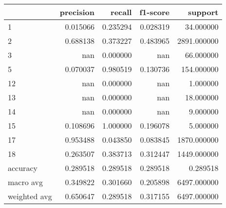 \begin{tabular}{lrrrr}
\toprule
 & precision & recall & f1-score & support \\
\midrule
1 & 0.015066 & 0.235294 & 0.028319 & 34.000000 \\
2 & 0.688138 & 0.373227 & 0.483965 & 2891.000000 \\
3 & nan & 0.000000 & nan & 66.000000 \\
5 & 0.070037 & 0.980519 & 0.130736 & 154.000000 \\
12 & nan & 0.000000 & nan & 1.000000 \\
13 & nan & 0.000000 & nan & 18.000000 \\
14 & nan & 0.000000 & nan & 9.000000 \\
15 & 0.108696 & 1.000000 & 0.196078 & 5.000000 \\
17 & 0.953488 & 0.043850 & 0.083845 & 1870.000000 \\
18 & 0.263507 & 0.383713 & 0.312447 & 1449.000000 \\
accuracy & 0.289518 & 0.289518 & 0.289518 & 0.289518 \\
macro avg & 0.349822 & 0.301660 & 0.205898 & 6497.000000 \\
weighted avg & 0.650647 & 0.289518 & 0.317155 & 6497.000000 \\
\bottomrule
\end{tabular}
